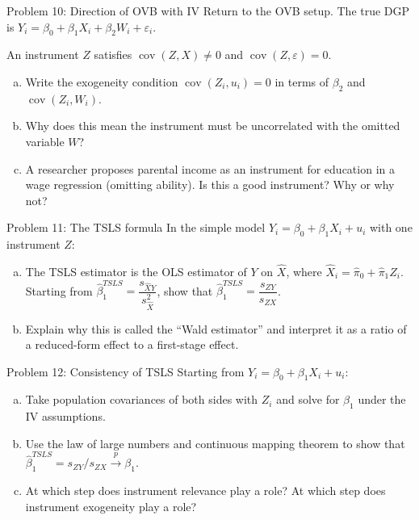 \documentclass[10pt]{beamer}
\begin{document}
\begin{frame}{Problem 10: Direction of OVB with IV}
\label{q10}
Return to the OVB setup. The true DGP is $Y_i = \beta_0 + \beta_1 X_i + \beta_2 W_i + \varepsilon_i$.

An instrument $Z$ satisfies $\operatorname{cov}(Z,X) \neq 0$ and $\operatorname{cov}(Z, \varepsilon) = 0$.

\begin{enumerate}[(a)]
  \item Write the exogeneity condition $\operatorname{cov}(Z_i, u_i) = 0$ in terms of $\beta_2$ and $\operatorname{cov}(Z_i, W_i)$.
  \item Why does this mean the instrument must be uncorrelated with the omitted variable $W$?
  \item A researcher proposes parental income as an instrument for education in a wage regression (omitting ability). Is this a good instrument? Why or why not?
\end{enumerate}

\vfill
\hfill\hyperlink{s10}{}
\end{frame}

\begin{frame}{Problem 11: The TSLS formula}
\label{q11}
In the simple model $Y_i = \beta_0 + \beta_1 X_i + u_i$ with one instrument $Z$:

\begin{enumerate}[(a)]
  \item The TSLS estimator is the OLS estimator of $Y$ on $\widehat{X}$, where $\widehat{X}_i = \widehat{\pi}_0 + \widehat{\pi}_1 Z_i$. Starting from $\widehat{\beta}_1^{TSLS} = \dfrac{s_{\widehat{X}Y}}{s_{\widehat{X}}^2}$, show that $\widehat{\beta}_1^{TSLS} = \dfrac{s_{ZY}}{s_{ZX}}$.

  \item Explain why this is called the ``Wald estimator'' and interpret it as a ratio of a reduced-form effect to a first-stage effect.
\end{enumerate}

\vfill
\hfill\hyperlink{s11}{}
\end{frame}

\begin{frame}{Problem 12: Consistency of TSLS}
\label{q12}
Starting from $Y_i = \beta_0 + \beta_1 X_i + u_i$:

\begin{enumerate}[(a)]
  \item Take population covariances of both sides with $Z_i$ and solve for $\beta_1$ under the IV assumptions.
  \item Use the law of large numbers and continuous mapping theorem to show that $\widehat{\beta}_1^{TSLS} = s_{ZY}/s_{ZX} \xrightarrow{p} \beta_1$.
  \item At which step does instrument relevance play a role? At which step does instrument exogeneity play a role?
\end{enumerate}

\vfill
\hfill\hyperlink{s12}{}
\end{frame}
\end{document}
